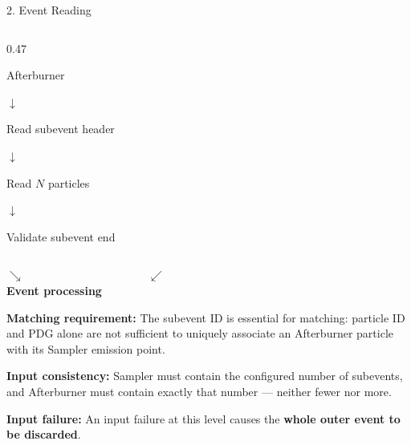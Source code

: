 \documentclass{beamer}
\begin{document}
\begin{frame}{2. Event Reading}
\begin{columns}[T]
\begin{column}{0.47\textwidth}
\begin{block}{Afterburner}
\begin{center}
$\downarrow$

Read subevent header

$\downarrow$

Read $N$ particles

$\downarrow$

Validate subevent end
\end{center}
\end{block}
\end{column}

\end{columns}

\vspace{-0.6em}
\begin{center}
$\searrow\hspace{11em}\swarrow$\\[-0.2em]
\textbf{Event processing}
\end{center}

\vspace{-0.4em}
\scriptsize
\textbf{Matching requirement:} The subevent ID is essential for matching: particle ID and PDG alone are not sufficient to uniquely associate an Afterburner particle with its Sampler emission point.

\medskip
\textbf{Input consistency:} Sampler must contain the configured number of subevents, and Afterburner must contain exactly that number --- neither fewer nor more.

\medskip
\alert{\textbf{Input failure:} An input failure at this level causes the \textbf{whole outer event to be discarded}.}

\end{frame}
\end{document}
